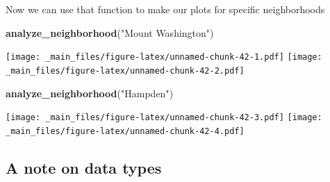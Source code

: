 \documentclass[]{article}
\newenvironment{Shaded}{\begin{snugshade}}{\end{snugshade}}
\newcommand{\KeywordTok}[1]{\textcolor[rgb]{0.13,0.29,0.53}{\textbf{{#1}}}}
\newcommand{\DataTypeTok}[1]{\textcolor[rgb]{0.13,0.29,0.53}{{#1}}}
\newcommand{\StringTok}[1]{\textcolor[rgb]{0.31,0.60,0.02}{{#1}}}
\newcommand{\NormalTok}[1]{{#1}}
\theoremstyle{definition}
\theoremstyle{definition}
\theoremstyle{remark}
\begin{document}
\begin{Shaded}
\end{Shaded}

Now we can use that function to make our plots for specific
neighborhoods

\begin{Shaded}
\begin{Highlighting}[]
\KeywordTok{analyze_neighborhood}\NormalTok{(}\StringTok{"Mount Washington"}\NormalTok{)}
\end{Highlighting}
\end{Shaded}

\texttt{[image: \_main\_files/figure-latex/unnamed-chunk-42-1.pdf]}
\texttt{[image: \_main\_files/figure-latex/unnamed-chunk-42-2.pdf]}

\begin{Shaded}
\begin{Highlighting}[]
\KeywordTok{analyze_neighborhood}\NormalTok{(}\StringTok{"Hampden"}\NormalTok{)}
\end{Highlighting}
\end{Shaded}

\texttt{[image: \_main\_files/figure-latex/unnamed-chunk-42-3.pdf]}
\texttt{[image: \_main\_files/figure-latex/unnamed-chunk-42-4.pdf]}

\subsection{A note on data types}\label{a-note-on-data-types}
\end{document}
